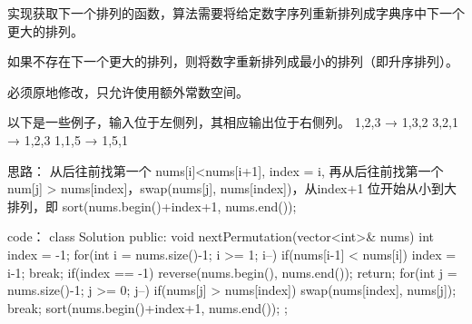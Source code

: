 实现获取下一个排列的函数，算法需要将给定数字序列重新排列成字典序中下一个更大的排列。

如果不存在下一个更大的排列，则将数字重新排列成最小的排列（即升序排列）。

必须原地修改，只允许使用额外常数空间。

以下是一些例子，输入位于左侧列，其相应输出位于右侧列。
1,2,3 → 1,3,2
3,2,1 → 1,2,3
1,1,5 → 1,5,1































思路：
从后往前找第一个 nums[i]<nums[i+1], index = i, 再从后往前找第一个 num[j] > nums[index]，swap(nums[j], nums[index])，从index+1 位开始从小到大排列，即 sort(nums.begin()+index+1, nums.end());




























code：
class Solution {
public:
    void nextPermutation(vector<int>& nums) {
        int index = -1;
        for(int i = nums.size()-1; i >= 1; i--)
        {
            if(nums[i-1] < nums[i])
            {
                index = i-1; break;
            }
        }
        if(index == -1)
        {
            reverse(nums.begin(), nums.end());
            return;
        }
        for(int j = nums.size()-1; j >= 0; j--)
        {
            if(nums[j] > nums[index])
            {
                swap(nums[index], nums[j]); break;
            }
        }
        sort(nums.begin()+index+1, nums.end());
    }
};